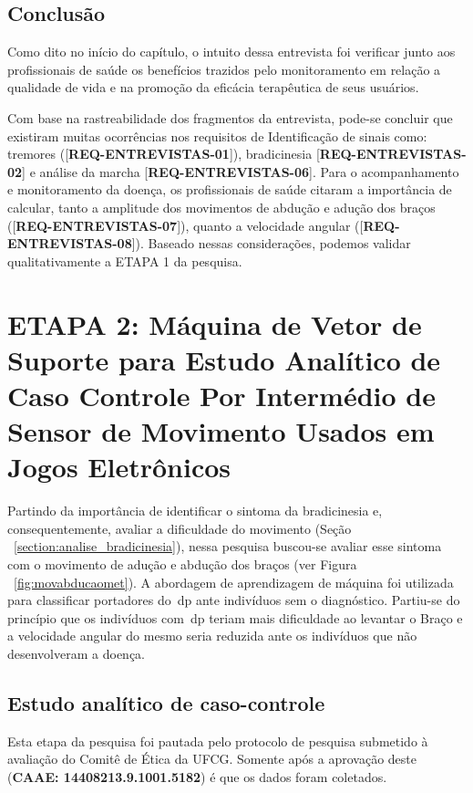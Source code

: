\subsection{Conclusão}
Como dito no início do capítulo, o intuito dessa entrevista foi verificar junto aos profissionais de saúde os benefícios trazidos pelo monitoramento em relação a qualidade de vida e na promoção da eficácia terapêutica de seus usuários.

Com base na rastreabilidade dos fragmentos da entrevista, pode-se concluir que existiram muitas ocorrências nos requisitos de Identificação de sinais como: tremores ([\textbf{REQ-ENTREVISTAS-01}]), bradicinesia [\textbf{REQ-ENTREVISTAS-02}] e análise da marcha [\textbf{REQ-ENTREVISTAS-06}]. Para o acompanhamento e monitoramento da doença, os profissionais de saúde citaram a importância de calcular, tanto a amplitude dos movimentos de abdução e adução dos braços ([\textbf{REQ-ENTREVISTAS-07}]), quanto a velocidade angular ([\textbf{REQ-ENTREVISTAS-08}]). Baseado nessas considerações, podemos validar qualitativamente a ETAPA 1 da pesquisa.


\section{ETAPA 2: Máquina de Vetor de Suporte para Estudo Analítico de Caso Controle Por Intermédio de Sensor de Movimento Usados em Jogos Eletrônicos}\label{sec:resultado_svm}

Partindo da importância de identificar o sintoma da bradicinesia e, consequentemente, avaliar a dificuldade do movimento (Seção ~\ref{section:analise_bradicinesia}), nessa pesquisa buscou-se avaliar esse sintoma com o movimento de adução e abdução dos braços (ver Figura ~\ref{fig:movabducaomet}). A abordagem de aprendizagem de máquina foi utilizada para classificar portadores do~\ac{dp} ante indivíduos sem o diagnóstico. Partiu-se do princípio que os indivíduos com~\ac{dp} teriam mais dificuldade ao levantar o Braço e a velocidade angular do mesmo seria reduzida ante os indivíduos que não desenvolveram a doença.

\subsection{Estudo analítico de caso-controle}\label{section:estudo_caso_controle}
Esta etapa da pesquisa foi pautada pelo protocolo de pesquisa submetido à avaliação do Comitê de Ética da UFCG. Somente após a aprovação deste (\textbf{CAAE: 14408213.9.1001.5182}) é que os dados foram coletados. 

